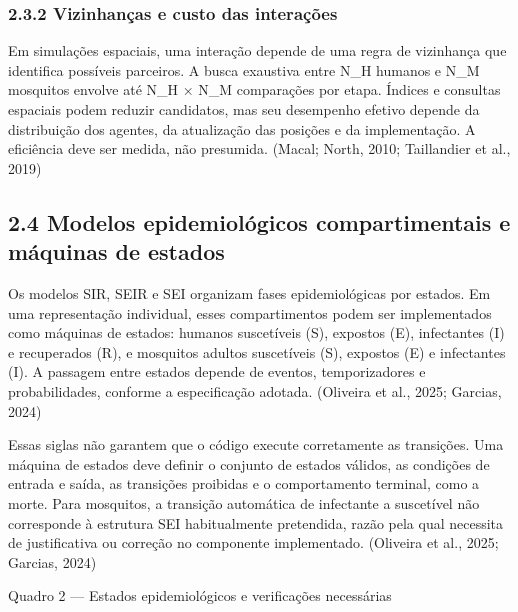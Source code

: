 \subsubsection{2.3.2 Vizinhanças e custo das
interações}\label{vizinhanuxe7as-e-custo-das-interauxe7uxf5es}

Em simulações espaciais, uma interação depende de uma regra de
vizinhança que identifica possíveis parceiros. A busca exaustiva entre
N\_H humanos e N\_M mosquitos envolve até N\_H × N\_M comparações por
etapa. Índices e consultas espaciais podem reduzir candidatos, mas seu
desempenho efetivo depende da distribuição dos agentes, da atualização
das posições e da implementação. A eficiência deve ser medida, não
presumida. (Macal; North, 2010; Taillandier et al., 2019)

\subsection{2.4 Modelos epidemiológicos compartimentais e máquinas de
estados}\label{modelos-epidemioluxf3gicos-compartimentais-e-muxe1quinas-de-estados}

Os modelos SIR, SEIR e SEI organizam fases epidemiológicas por estados.
Em uma representação individual, esses compartimentos podem ser
implementados como máquinas de estados: humanos suscetíveis (S),
expostos (E), infectantes (I) e recuperados (R), e mosquitos adultos
suscetíveis (S), expostos (E) e infectantes (I). A passagem entre
estados depende de eventos, temporizadores e probabilidades, conforme a
especificação adotada. (Oliveira et al., 2025; Garcias, 2024)

Essas siglas não garantem que o código execute corretamente as
transições. Uma máquina de estados deve definir o conjunto de estados
válidos, as condições de entrada e saída, as transições proibidas e o
comportamento terminal, como a morte. Para mosquitos, a transição
automática de infectante a suscetível não corresponde à estrutura SEI
habitualmente pretendida, razão pela qual necessita de justificativa ou
correção no componente implementado. (Oliveira et al., 2025; Garcias,
2024)

Quadro 2 --- Estados epidemiológicos e verificações necessárias

